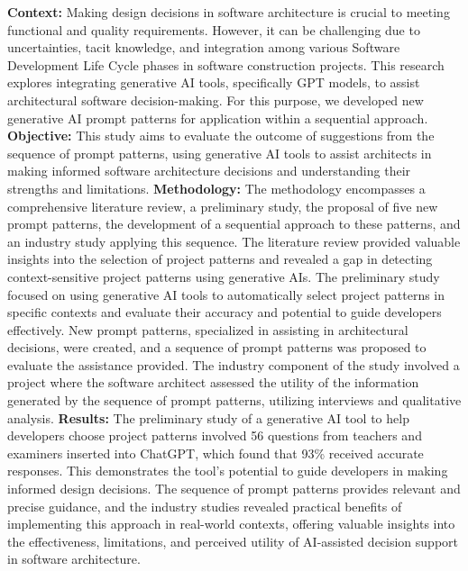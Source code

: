 \begin{abstracten}
\textbf{Context:} Making design decisions in software architecture is crucial to meeting functional and quality requirements. However, it can be challenging due to uncertainties, tacit knowledge, and integration among various Software Development Life Cycle phases in software construction projects. This research explores integrating generative AI tools, specifically GPT models, to assist architectural software decision-making. For this purpose, we developed new generative AI prompt patterns for application within a sequential approach.
\textbf{Objective:} This study aims to evaluate the outcome of suggestions from the sequence of prompt patterns, using generative AI tools to assist architects in making informed software architecture decisions and understanding their strengths and limitations.
\textbf{Methodology:} The methodology encompasses a comprehensive literature review, a preliminary study, the proposal of five new prompt patterns, the development of a sequential approach to these patterns, and an industry study applying this sequence. The literature review provided valuable insights into the selection of project patterns and revealed a gap in detecting context-sensitive project patterns using generative AIs. The preliminary study focused on using generative AI tools to automatically select project patterns in specific contexts and evaluate their accuracy and potential to guide developers effectively. New prompt patterns, specialized in assisting in architectural decisions, were created, and a sequence of prompt patterns was proposed to evaluate the assistance provided. The industry component of the study involved a project where the software architect assessed the utility of the information generated by the sequence of prompt patterns, utilizing interviews and qualitative analysis.
\textbf{Results:} The preliminary study of a generative AI tool to help developers choose project patterns involved 56 questions from teachers and examiners inserted into ChatGPT, which found that 93\% received accurate responses. This demonstrates the tool’s potential to guide developers in making informed design decisions. The sequence of prompt patterns provides relevant and precise guidance, and the industry studies revealed practical benefits of implementing this approach in real-world contexts, offering valuable insights into the effectiveness, limitations, and perceived utility of AI-assisted decision support in software architecture.
\end{abstracten}
